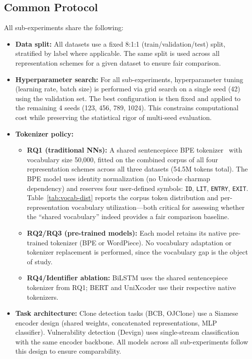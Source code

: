 \documentclass[pdflatex,sn-mathphys,Numbered]{sn-jnl}
\begin{document}
\subsection{Common Protocol}

All sub-experiments share the following:
\begin{itemize}
\item \textbf{Data split:} All datasets use a fixed 8:1:1 (train/validation/test) split, stratified by label where applicable. The same split is used across all representation schemes for a given dataset to ensure fair comparison.
\item \textbf{Hyperparameter search:} For all sub-experiments, hyperparameter tuning (learning rate, batch size) is performed via grid search on a single seed (42) using the validation set. The best configuration is then fixed and applied to the remaining 4 seeds (123, 456, 789, 1024). This constrains computational cost while preserving the statistical rigor of multi-seed evaluation.
\item \textbf{Tokenizer policy:}
  \begin{itemize}
  \item \textbf{RQ1 (traditional NNs):} A shared sentencepiece BPE tokenizer~\citep{kudo2018sentencepiece} with vocabulary size 50,000, fitted on the combined corpus of all four representation schemes across all three datasets (54.5M tokens total). The BPE model uses identity normalization (no Unicode charmap dependency) and reserves four user-defined symbols: \texttt{ID}, \texttt{LIT}, \texttt{ENTRY}, \texttt{EXIT}. Table~\ref{tab:vocab-dist} reports the corpus token distribution and per-representation vocabulary utilization---both critical for assessing whether the ``shared vocabulary'' indeed provides a fair comparison baseline.
  \item \textbf{RQ2/RQ3 (pre-trained models):} Each model retains its native pre-trained tokenizer (BPE or WordPiece). No vocabulary adaptation or tokenizer replacement is performed, since the vocabulary gap is the object of study.
  \item \textbf{RQ4/Identifier ablation:} BiLSTM uses the shared sentencepiece tokenizer from RQ1; BERT and UniXcoder use their respective native tokenizers.
  \end{itemize}
\item \textbf{Task architecture:} Clone detection tasks (BCB, OJClone) use a Siamese encoder design (shared weights, concatenated representations, MLP classifier). Vulnerability detection (Devign) uses single-stream classification with the same encoder backbone. All models across all sub-experiments follow this design to ensure comparability.

\end{itemize}
\end{document}
